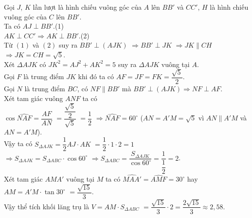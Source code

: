 \begin{ex}
{\begin{center}
\end{center}
\noindent Gọi $J$,  $K$ lần lượt là hình chiếu vuông góc của $A$ lên $BB'$ và $CC'$,  $H$ là hình chiếu vuông góc của $C$ lên $BB'$.\\
Ta có $AJ\perp BB'$.\hfill (1)\\
$AK\perp CC'\Rightarrow AK\perp BB'$.\hfill (2)\\
Từ $(1)$ và $(2)$ suy ra $BB'\perp\left(AJK\right)$ $\Rightarrow BB'\perp JK$ $\Rightarrow JK\parallel CH$ $\Rightarrow JK=CH=\sqrt 5 $.\\
Xét $\Delta AJK$ có $J{K^2}=A{J^2}+A{K^2}=5$ suy ra $\Delta AJK$ vuông tại $A$.\\
Gọi $F$ là trung điểm $JK$ khi đó ta có $AF=JF=FK=\dfrac{\sqrt 5}{2}$.\\
Gọi $N$ là trung điểm $BC$, có $NF\parallel BB'$ mà $BB'\perp\left(AJK\right)\Rightarrow NF\perp AF$.\\ Xét tam giác vuông $ANF$ ta có \\
$\cos\widehat{NAF}=\dfrac{AF}{AN}$ $=\dfrac{\dfrac{\sqrt 5}{2}}{\sqrt 5}$ $=\dfrac{1}{2}$ $\Rightarrow\widehat{NAF}=60^\circ$  ($AN=A'M=\sqrt 5 $ vì $AN \parallel A'M$ và $AN=A'M$).\\
Vậy ta có $S_{\Delta AJK}=\dfrac{1}{2}AJ\cdot AK$ $=\dfrac{1}{2}\cdot 1\cdot 2=1$\\ $\Rightarrow{S_{\Delta AJK}}=S_{\Delta ABC}\cdot \cos{60^\circ}$ $\Rightarrow{S_{\Delta ABC}}=\dfrac{S_{\Delta AJK}}{\cos{60^\circ}}=\dfrac{1}{\dfrac{1}{2}}=2$.\\
Xét tam giác $AMA'$ vuông tại $M$ ta có $\widehat{MAA'}=\widehat{AMF}=30^\circ$ hay $AM=A'M\cdot \tan{30^\circ}$ $=\dfrac{\sqrt{15}}{3}$.\\
Vậy thể tích khối lăng trụ là $V=AM\cdot S_{\Delta ABC}$ $=\dfrac{\sqrt{15}}{3}\cdot 2=\dfrac{2\sqrt{15}}{3}\approx 2{,}58$.}
\end{ex}

